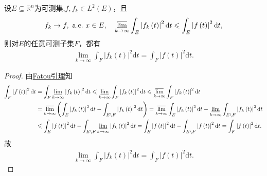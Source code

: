 \documentclass[../../main.tex]{subfiles}%
\begin{document}
\begin{proposition}\label{proposition:Fatou引理的应用11}
设$E\subseteq \mathbb{R}^n$为可测集,$f,f_k\in L^2\left( E \right)$，且
\begin{align*}
f_k\rightarrow f,\ \mathrm{a.e.}\ x\in E,\quad \varlimsup\limits_{k\rightarrow \infty}\int_E{\left| f_k\left( t \right) \right|^2\mathrm{d}t}\leqslant \int_E{\left| f\left( t \right) \right|^2\mathrm{d}t},
\end{align*}
则对$E$的任意可测子集$F$，都有
\begin{align*}
\lim\limits_{k\rightarrow \infty}\int_F{\left| f_k\left( t \right) \right|^2\mathrm{d}t}=\int_F{\left| f\left( t \right) \right|^2\mathrm{d}t}.
\end{align*}
\end{proposition}
\begin{proof}
由\hyperref[theorem:Fatou引理]{Fatou引理}知
\begin{align*}
\int_F{\left| f\left( t \right) \right|^2\mathrm{d}t}&=\int_F{\varliminf\limits_{k\rightarrow \infty}\left| f_k\left( t \right) \right|^2\mathrm{d}t}\leqslant \varliminf\limits_{k\rightarrow \infty}\int_F{\left| f_k\left( t \right) \right|^2\mathrm{d}t}\leqslant \varlimsup\limits_{k\rightarrow \infty}\int_F{\left| f_k\left( t \right) \right|^2\mathrm{d}t}\\
&=\varlimsup\limits_{k\rightarrow \infty}\left( \int_E{\left| f_k\left( t \right) \right|^2\mathrm{d}t}-\int_{E\setminus F}{\left| f_k\left( t \right) \right|^2\mathrm{d}t} \right) =\varlimsup\limits_{k\rightarrow \infty}\int_E{\left| f_k\left( t \right) \right|^2\mathrm{d}t}-\varliminf\limits_{k\rightarrow \infty}\int_{E\setminus F}{\left| f_k\left( t \right) \right|^2\mathrm{d}t}\\
&\leqslant \int_E{\left| f\left( t \right) \right|^2\mathrm{d}t}-\int_{E\setminus F}{\varliminf\limits_{k\rightarrow \infty}\left| f_k\left( t \right) \right|^2\mathrm{d}t}=\int_E{\left| f\left( t \right) \right|^2\mathrm{d}t}-\int_{E\setminus F}{\left| f\left( t \right) \right|^2\mathrm{d}t}=\int_F{\left| f\left( t \right) \right|^2\mathrm{d}t}.
\end{align*}
故
\begin{align*}
\lim\limits_{k\rightarrow \infty}\int_F{\left| f_k\left( t \right) \right|^2\mathrm{d}t}=\int_F{\left| f\left( t \right) \right|^2\mathrm{d}t}.
\end{align*}
\end{proof}
\end{document}
